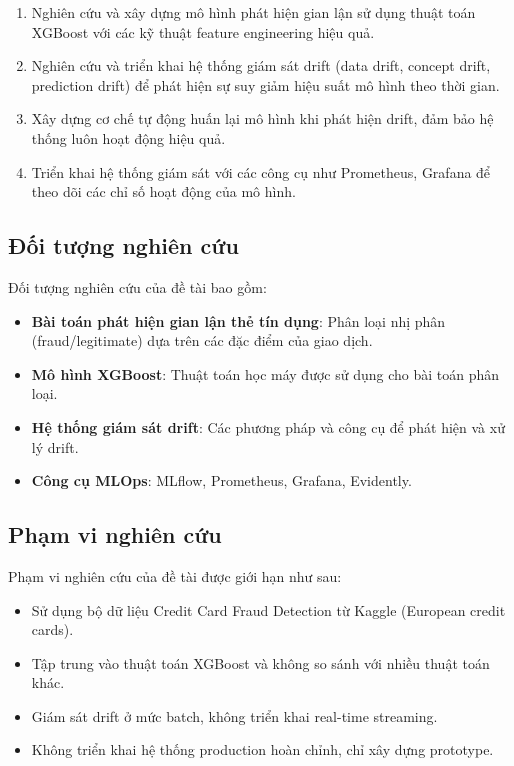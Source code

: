 \begin{enumerate}
    \item Nghiên cứu và xây dựng mô hình phát hiện gian lận sử dụng thuật toán XGBoost với các kỹ thuật feature engineering hiệu quả.
    \item Nghiên cứu và triển khai hệ thống giám sát drift (data drift, concept drift, prediction drift) để phát hiện sự suy giảm hiệu suất mô hình theo thời gian.
    \item Xây dựng cơ chế tự động huấn lại mô hình khi phát hiện drift, đảm bảo hệ thống luôn hoạt động hiệu quả.
    \item Triển khai hệ thống giám sát với các công cụ như Prometheus, Grafana để theo dõi các chỉ số hoạt động của mô hình.
\end{enumerate}

\subsection{Đối tượng nghiên cứu}
\label{sec:DoiTuong}

Đối tượng nghiên cứu của đề tài bao gồm:

\begin{itemize}
    \item \textbf{Bài toán phát hiện gian lận thẻ tín dụng}: Phân loại nhị phân (fraud/legitimate) dựa trên các đặc điểm của giao dịch.
    \item \textbf{Mô hình XGBoost}: Thuật toán học máy được sử dụng cho bài toán phân loại.
    \item \textbf{Hệ thống giám sát drift}: Các phương pháp và công cụ để phát hiện và xử lý drift.
    \item \textbf{Công cụ MLOps}: MLflow, Prometheus, Grafana, Evidently.
\end{itemize}

\subsection{Phạm vi nghiên cứu}
\label{sec:PhamVi}

Phạm vi nghiên cứu của đề tài được giới hạn như sau:

\begin{itemize}
    \item Sử dụng bộ dữ liệu Credit Card Fraud Detection từ Kaggle (European credit cards).
    \item Tập trung vào thuật toán XGBoost và không so sánh với nhiều thuật toán khác.
    \item Giám sát drift ở mức batch, không triển khai real-time streaming.
    \item Không triển khai hệ thống production hoàn chỉnh, chỉ xây dựng prototype.
\end{itemize}

